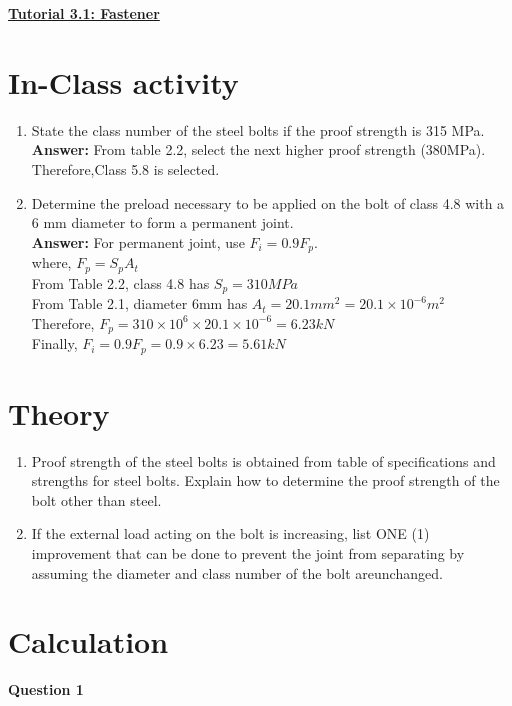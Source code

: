 \documentclass[a4paper, fleqn]{article}
\begin{document}
\underline{\textbf{Tutorial 3.1: Fastener}}
\vspace{10pt}

\section*{In-Class activity}
\begin{enumerate}
    \item State the class number of the steel bolts if the proof strength is 315 MPa. \\
    \textbf{Answer:} From table 2.2, select the next higher proof strength (380MPa). Therefore,Class 5.8 is selected.
    \item Determine the preload necessary to be applied on the bolt of class 4.8 with a 6 mm diameter to form a permanent joint.\\
    
    \textbf{Answer:} For permanent joint, use $F_i=0.9F_p$.\\
    where, $F_p=S_p A_t$\\
    From Table 2.2, class 4.8 has $S_p=310MPa$\\
    From Table 2.1, diameter 6mm has $A_t=20.1mm^2=20.1\times 10^{-6}m^2$\\
    Therefore, $F_p=310\times 10^6 \times 20.1\times 10^{-6}=6.23kN$\\
    Finally, $F_i=0.9F_p=0.9\times 6.23=5.61kN$\\
\end{enumerate}

\section*{Theory}

\begin{enumerate}
    \item Proof strength of the steel bolts is obtained from table of specifications and strengths for steel bolts. Explain how to determine the proof strength of the bolt other than steel.
    \item If the external load acting on the bolt is increasing, list ONE (1) improvement that can be done to prevent the joint from separating by assuming the diameter and class number of the bolt areunchanged.
\end{enumerate}


\newpage

\section*{Calculation}
\textbf{Question 1}
\end{document}
